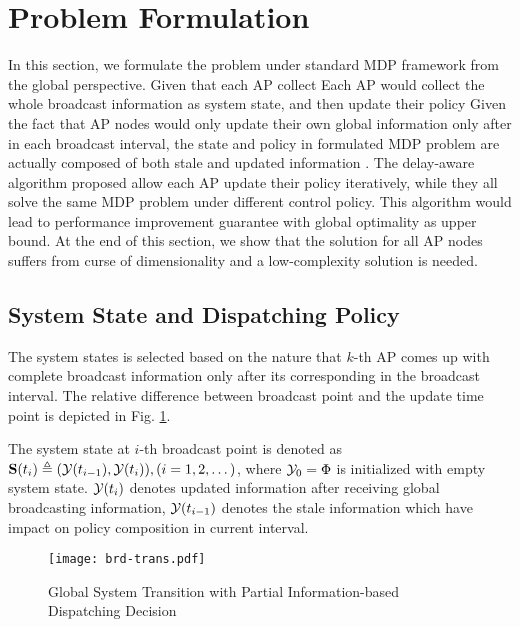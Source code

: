 \section{Problem Formulation}
In this section, we formulate the problem under standard MDP framework from the global perspective.
Given that each AP collect 
Each AP would collect the whole broadcast information as system state, and then update their policy 
Given the fact that AP nodes would only update their own global information only after \brdelay in each broadcast interval, the state and policy in formulated MDP problem are actually composed of both stale and updated information .
The delay-aware algorithm proposed allow each AP update their policy iteratively, while they all solve the same MDP problem under different control policy. This algorithm would lead to performance improvement guarantee with global optimality as upper bound.
At the end of this section, we show that the solution for all AP nodes suffers from curse of dimensionality and a low-complexity solution is needed.

\subsection{System State and Dispatching Policy}
The system states is selected based on the nature that $k$-th AP comes up with complete broadcast information only after its corresponding \brdelay in the broadcast interval.
The relative difference between broadcast point and the update time point is depicted in Fig. \ref{fig:brd-trans}.
\begin{definition}
    The system state at $i$-th broadcast point is denoted as
    $\mathbf{S}(t_i) \triangleq (\mathcal{Y}(t_{i-1}), \mathcal{Y}(t_{i})), (i=1,2,\dots)$,
    where $\mathcal{Y}_{0} =\Phi$ is initialized with empty system state.
    $\mathcal{Y}(t_{i})$ denotes updated information after receiving global broadcasting information, $\mathcal{Y}(t_{i-1})$ denotes the stale information which have impact on policy composition in current interval.
\end{definition}

\begin{figure}[ht]
    \centering
    \texttt{[image: brd-trans.pdf]}
    \caption{Global System Transition with Partial Information-based Dispatching Decision}
    \label{fig:brd-trans}
\end{figure}

